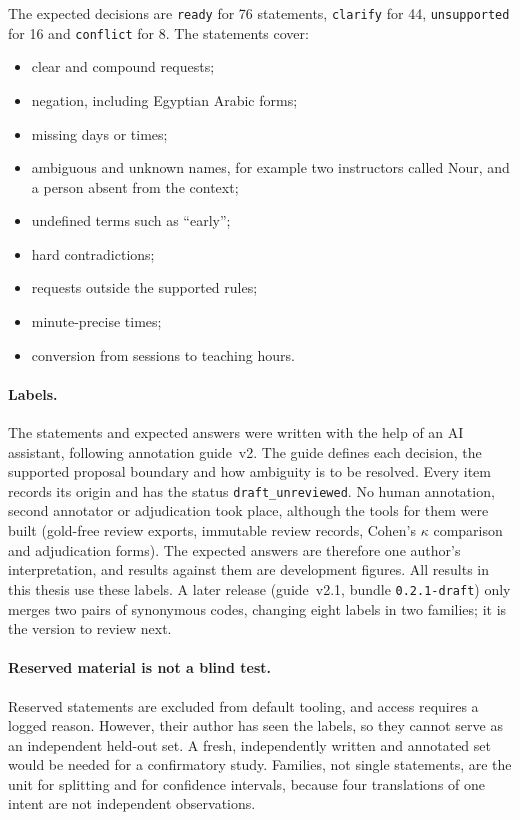 The expected decisions are \texttt{ready} for 76 statements, \texttt{clarify} for 44, \texttt{unsupported} for 16 and \texttt{conflict} for 8. The statements cover:
\begin{itemize}
\item clear and compound requests;
\item negation, including Egyptian Arabic forms;
\item missing days or times;
\item ambiguous and unknown names, for example two instructors called Nour, and a person absent from the context;
\item undefined terms such as ``early'';
\item hard contradictions;
\item requests outside the supported rules;
\item minute-precise times;
\item conversion from sessions to teaching hours.
\end{itemize}

\paragraph{Labels.} The statements and expected answers were written with the help of an AI assistant, following annotation guide~v2. The guide defines each decision, the supported proposal boundary and how ambiguity is to be resolved. Every item records its origin and has the status \texttt{draft\_unreviewed}. No human annotation, second annotator or adjudication took place, although the tools for them were built (gold-free review exports, immutable review records, Cohen's $\kappa$ comparison and adjudication forms). The expected answers are therefore one author's interpretation, and results against them are development figures. All results in this thesis use these labels. A later release (guide~v2.1, bundle \texttt{0.2.1-draft}) only merges two pairs of synonymous codes, changing eight labels in two families; it is the version to review next.

\paragraph{Reserved material is not a blind test.} Reserved statements are excluded from default tooling, and access requires a logged reason. However, their author has seen the labels, so they cannot serve as an independent held-out set. A fresh, independently written and annotated set would be needed for a confirmatory study. Families, not single statements, are the unit for splitting and for confidence intervals, because four translations of one intent are not independent observations.

